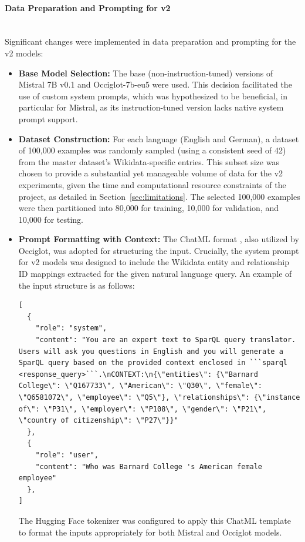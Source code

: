 \paragraph{Data Preparation and Prompting for v2} \mbox{}\\
Significant changes were implemented in data preparation and prompting for the v2 models:
\begin{itemize}
    \item \textbf{Base Model Selection:} The base (non-instruction-tuned) versions of Mistral 7B v0.1 and Occiglot-7b-eu5 were used. This decision facilitated the use of custom system prompts, which was hypothesized to be beneficial, in particular for Mistral, as its instruction-tuned version lacks native system prompt support.
    \item \textbf{Dataset Construction:} For each language (English and German), a dataset of 100,000 examples was randomly sampled (using a consistent seed of 42) from the master dataset's Wikidata-specific entries. This subset size was chosen to provide a substantial yet manageable volume of data for the v2 experiments, given the time and computational resource constraints of the project, as detailed in Section~\ref{sec:limitations}. The selected 100,000 examples were then partitioned into 80,000 for training, 10,000 for validation, and 10,000 for testing.
    \item \textbf{Prompt Formatting with Context:} The ChatML format \cite{openai_python_v0_28_0}, also utilized by Occiglot, was adopted for structuring the input. 
    Crucially, the system prompt for v2 models was designed to include the Wikidata entity and relationship ID mappings extracted for the given natural language query.
     An example of the input structure is as follows:
\begin{lstlisting}[breaklines]
[
  {
    "role": "system",
    "content": "You are an expert text to SparQL query translator. Users will ask you questions in English and you will generate a SparQL query based on the provided context enclosed in ```sparql <response_query>```.\nCONTEXT:\n{\"entities\": {\"Barnard College\": \"Q167733\", \"American\": \"Q30\", \"female\": \"Q6581072\", \"employee\": \"Q5\"}, \"relationships\": {\"instance of\": \"P31\", \"employer\": \"P108\", \"gender\": \"P21\", \"country of citizenship\": \"P27\"}}"
  },
  {
    "role": "user",
    "content": "Who was Barnard College 's American female employee"
  },
]

\end{lstlisting}
    The Hugging Face tokenizer was configured to apply this ChatML template to format the inputs appropriately for both Mistral and Occiglot models.
\end{itemize}

